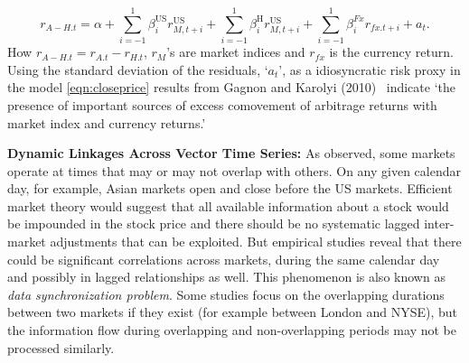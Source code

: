 	\begin{equation} \label{eqn:closeprice}
	r_{A-H.t}= \alpha + \sum_{i= -1}^1 \beta_i^{\text{US}} r_{M,t+i}^\text{US} + \sum_{i= -1}^1 \beta_i^\text{H} r_{M,t+i}^\text{US} + \sum_{i= -1}^1 \beta_i^{Fx} r_{fx.t+i} + a_t.
	\end{equation}
How $r_{A-H.t}= r_{A.t} - r_{H.t}$, $r_M$'s are market indices and $r_{fx}$ is the currency return. Using the standard deviation of the residuals, `$a_t$', as a idiosyncratic risk proxy in the model \eqref{eqn:closeprice} results from Gagnon and Karolyi (2010)~\cite{gagkar} indicate `the presence of important sources of excess comovement of arbitrage returns with market index and currency returns.' \twomedskip



\noindent\textbf{Dynamic Linkages Across Vector Time Series:} As observed, some markets operate at times that may or may not overlap with others. On any given calendar day, for example, Asian markets open and close before the US markets. Efficient market theory would suggest that all available information about a stock would be impounded in the stock price and there should be no systematic lagged inter-market adjustments that can be exploited. But empirical studies reveal that there could be significant correlations across markets, during the same calendar day and possibly in lagged relationships as well. This phenomenon is also known as \emph{data synchronization problem}. Some studies focus on the overlapping durations between two markets if they exist (for example between London and NYSE), but the information flow during overlapping and non-overlapping periods may not be processed similarly. 


